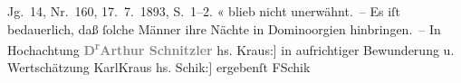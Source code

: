 \begin{ledgroupsized}[t]{13cm}
{{{                     Jg. 14, Nr. 160, 17. 7. 1893, S. 1–2. }}}\label{K_L00288_2h}« blieb nicht unerwähnt. – Es iſt bedauerlich, daß ſolche Männer ihre Nächte
               in Dominoorgien hinbringen. –\pend
           \pstart {\pb}In Hochachtung\pend{}\pstart
           \centering{}\textcolor{gray}{\textbf{D\textsuperscript{r}Arthur Schnitzler}}\pend
           \pstart
           \noindent{}{[}hs. Kraus:{]} in aufrichtiger Bewunderung u. Wertschätzung\pend
           \pstart \spacefill\mbox{KarlKraus}\pend{}\pstart
           \noindent{}{[}hs. Schik:{]} ergebenſt\pend
           \pstart \spacefill\mbox{FSchik}\pend{}
         
         \endnumbering{}\end{ledgroupsized}  \newcommand{\dateiname}{L00288}\newcommand{\titel}{Arthur Schnitzler, Karl Kraus und Friedrich Schik an Richard Beer-Hofmann, [31. 12. 1893?]}\newcommand{\editorInnen}{Martin Anton Müller und Gerd-Hermann Susen}
      
